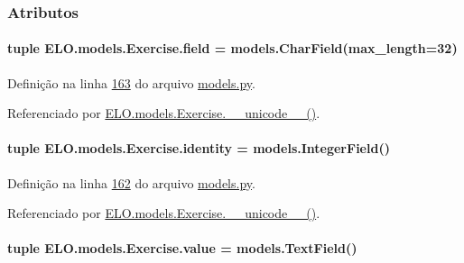 \subsubsection{Atributos}
\hypertarget{classELO_1_1models_1_1Exercise_a4567f8aa62747a0eabb1c89ab18ec1ce}{
\paragraph[{field}]{\setlength{\rightskip}{0pt plus 5cm}tuple E\-L\-O.\-models.\-Exercise.\-field = models.\-Char\-Field(max\-\_\-length=32)\hspace{0.3cm}{\ttfamily [static]}}}\label{classELO_1_1models_1_1Exercise_a4567f8aa62747a0eabb1c89ab18ec1ce}


Definição na linha \hyperlink{ELO_2models_8py_source_l00163}{163} do arquivo \hyperlink{ELO_2models_8py_source}{models.\-py}.



Referenciado por \hyperlink{classELO_1_1models_1_1Exercise_af3e991e5610cec815a2c3260ec6aae0b}{E\-L\-O.\-models.\-Exercise.\-\_\-\-\_\-unicode\-\_\-\-\_\-()}.

\hypertarget{classELO_1_1models_1_1Exercise_a0b63268e129a279de260ad21060a1b55}{
\paragraph[{identity}]{\setlength{\rightskip}{0pt plus 5cm}tuple E\-L\-O.\-models.\-Exercise.\-identity = models.\-Integer\-Field()\hspace{0.3cm}{\ttfamily [static]}}}\label{classELO_1_1models_1_1Exercise_a0b63268e129a279de260ad21060a1b55}


Definição na linha \hyperlink{ELO_2models_8py_source_l00162}{162} do arquivo \hyperlink{ELO_2models_8py_source}{models.\-py}.



Referenciado por \hyperlink{classELO_1_1models_1_1Exercise_af3e991e5610cec815a2c3260ec6aae0b}{E\-L\-O.\-models.\-Exercise.\-\_\-\-\_\-unicode\-\_\-\-\_\-()}.

\hypertarget{classELO_1_1models_1_1Exercise_ae4d0d7ecfe0004385c031cbba76f3b4d}{
\paragraph[{value}]{\setlength{\rightskip}{0pt plus 5cm}tuple E\-L\-O.\-models.\-Exercise.\-value = models.\-Text\-Field()\hspace{0.3cm}{\ttfamily [static]}}}\label{classELO_1_1models_1_1Exercise_ae4d0d7ecfe0004385c031cbba76f3b4d}


